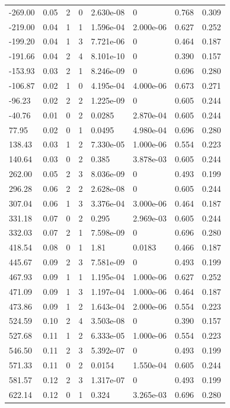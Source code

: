 \documentclass[preview]{standalone}
\begin{document}
{{\begin{tabular}{L{1.2cm}C{1.2cm} C{0.3cm}C{0.5cm} C{1.4cm}C{1.4cm} C{1.4cm}C{1.4cm}}
  -269.00  &  0.05  & 2     &  0 &  2.630e-08  & 0  & 0.768 &  0.309   \\ 
  -219.00  &  0.04  & 1     &  1 &  1.596e-04  & 2.000e-06  & 0.627 &  0.252   \\ 
  -199.20  &  0.04  & 1     &  3 &  7.721e-06  & 0  & 0.464 &  0.187   \\ 
  -191.66  &  0.04  & 2     &  4 &  8.101e-10  & 0  & 0.390 &  0.157   \\ 
  -153.93  &  0.03  & 2     &  1 &  8.246e-09  & 0  & 0.696 &  0.280   \\ 
  -106.87  &  0.02  & 1     &  0 &  4.195e-04  & 4.000e-06  & 0.673 &  0.271   \\ 
  -96.23  &  0.02  & 2     &  2 &  1.225e-09  & 0  & 0.605 &  0.244   \\ 
  -40.76  &  0.01  & 0     &  2 &  0.0285  & 2.870e-04  & 0.605 &  0.244   \\ 
  77.95  &  0.02  & 0     &  1 &  0.0495  & 4.980e-04  & 0.696 &  0.280   \\ 
  138.43  &  0.03  & 1     &  2 &  7.330e-05  & 1.000e-06  & 0.554 &  0.223   \\ 
  140.64  &  0.03  & 0     &  2 &  0.385  & 3.878e-03  & 0.605 &  0.244   \\ 
  262.00  &  0.05  & 2     &  3 &  8.036e-09  & 0  & 0.493 &  0.199   \\ 
  296.28  &  0.06  & 2     &  2 &  2.628e-08  & 0  & 0.605 &  0.244   \\ 
  307.04  &  0.06  & 1     &  3 &  3.376e-04  & 3.000e-06  & 0.464 &  0.187   \\ 
  331.18  &  0.07  & 0     &  2 &  0.295  & 2.969e-03  & 0.605 &  0.244   \\ 
  332.03  &  0.07  & 2     &  1 &  7.598e-09  & 0  & 0.696 &  0.280   \\ 
  418.54  &  0.08  & 0     &  1 &  1.81  & 0.0183  & 0.466 &  0.187   \\ 
  445.67  &  0.09  & 2     &  3 &  7.581e-09  & 0  & 0.493 &  0.199   \\ 
  467.93  &  0.09  & 1     &  1 &  1.195e-04  & 1.000e-06  & 0.627 &  0.252   \\ 
  471.09  &  0.09  & 1     &  3 &  1.197e-04  & 1.000e-06  & 0.464 &  0.187   \\ 
  473.86  &  0.09  & 1     &  2 &  1.643e-04  & 2.000e-06  & 0.554 &  0.223   \\ 
  524.59  &  0.10  & 2     &  4 &  3.503e-08  & 0  & 0.390 &  0.157   \\ 
  527.68  &  0.11  & 1     &  2 &  6.333e-05  & 1.000e-06  & 0.554 &  0.223   \\ 
  546.50  &  0.11  & 2     &  3 &  5.392e-07  & 0  & 0.493 &  0.199   \\ 
  571.33  &  0.11  & 0     &  2 &  0.0154  & 1.550e-04  & 0.605 &  0.244   \\ 
  581.57  &  0.12  & 2     &  3 &  1.317e-07  & 0  & 0.493 &  0.199   \\ 
  622.14  &  0.12  & 0     &  1 &  0.324  & 3.265e-03  & 0.696 &  0.280   \\ 
\hline 
\end{tabular} 

}}
\end{document}

